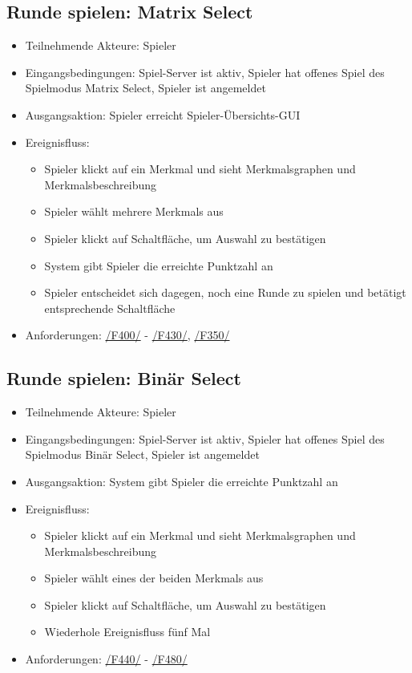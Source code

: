 \documentclass[a4paper]{scrreprt}
\begin{document}
    \subsection{Runde spielen: Matrix Select}
    \begin{itemize}
    	\item Teilnehmende Akteure: \Gls{Spieler}

    	\item Eingangsbedingungen: \Gls{Spiel-Server} ist aktiv, \Gls{Spieler} hat offenes \Gls{Spiel} des \Gls{Spielmodus} Matrix Select, \Gls{Spieler} ist angemeldet
        \item Ausgangsaktion: \Gls{Spieler} erreicht Spieler-Übersichts-GUI
    	\item Ereignisfluss:
    	\begin{itemize}
    		\item \Gls{Spieler} klickt auf ein \Gls{Merkmal} und sieht Merkmalsgraphen und Merkmalsbeschreibung
    		\item \Gls{Spieler} wählt mehrere \Glspl{Merkmal} aus
    		\item \Gls{Spieler} klickt auf Schaltfläche, um Auswahl zu bestätigen
    		\item System gibt \Gls{Spieler} die erreichte Punktzahl an
    		\item \Gls{Spieler} entscheidet sich dagegen, noch eine Runde zu spielen und betätigt entsprechende Schaltfläche
    	\end{itemize}
        \item Anforderungen: \hyperlink{F400}{/F400/} - \hyperlink{F430}{/F430/}, \hyperlink{F350}{/F350/}

    \end{itemize}
	
	\subsection{Runde spielen: Binär Select}
	\begin{itemize}
		\item Teilnehmende Akteure: \Gls{Spieler}

		\item Eingangsbedingungen: \Gls{Spiel-Server} ist aktiv, \Gls{Spieler} hat offenes \Gls{Spiel} des \Gls{Spielmodus} Binär Select, \Gls{Spieler} ist angemeldet
        \item Ausgangsaktion: System gibt \Gls{Spieler} die erreichte Punktzahl an
		\item Ereignisfluss:
		\begin{itemize}
			\item \Gls{Spieler} klickt auf ein \Gls{Merkmal} und sieht Merkmalsgraphen und Merkmalsbeschreibung
			\item \Gls{Spieler} wählt eines der beiden \Glspl{Merkmal} aus
			\item \Gls{Spieler} klickt auf Schaltfläche, um Auswahl zu bestätigen
            \item Wiederhole Ereignisfluss fünf Mal
		\end{itemize}
        \item Anforderungen: \hyperlink{F440}{/F440/} - \hyperlink{F480}{/F480/}
	\end{itemize}
\end{document}

